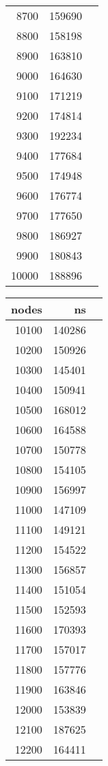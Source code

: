 \begin{figure}[H]
\begin{tabular}{r r r}
        8700 & 159690 \\
        8800 & 158198 \\
        8900 & 163810 \\
        9000 & 164630 \\
        9100 & 171219 \\
        9200 & 174814 \\
        9300 & 192234 \\
        9400 & 177684 \\
        9500 & 174948 \\
        9600 & 176774 \\
        9700 & 177650 \\
        9800 & 186927 \\
        9900 & 180843 \\
        10000 & 188896 \\
        \bottomrule
    \end{tabular}
    \quad
    \begin{tabular}{r r r}
        \toprule
        \textbf{nodes} & \textbf{ns} \\
        \midrule
        10100 & 140286 \\
        10200 & 150926 \\
        10300 & 145401 \\
        10400 & 150941 \\
        10500 & 168012 \\
        10600 & 164588 \\
        10700 & 150778 \\
        10800 & 154105 \\
        10900 & 156997 \\
        11000 & 147109 \\
        11100 & 149121 \\
        11200 & 154522 \\
        11300 & 156857 \\
        11400 & 151054 \\
        11500 & 152593 \\
        11600 & 170393 \\
        11700 & 157017 \\
        11800 & 157776 \\
        11900 & 163846 \\
        12000 & 153839 \\
        12100 & 187625 \\
        12200 & 164411 \\

\end{tabular}
\end{figure}
